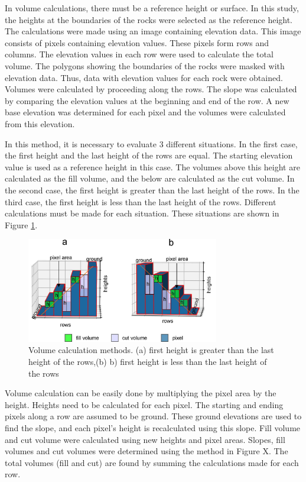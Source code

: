 \documentclass[a4paper,fleqn]{cas-sc}
\begin{document}
In volume calculations, there must be a reference height or surface. In this study, the heights at the boundaries of the rocks were selected as the reference height. The calculations were made using an image containing elevation data. This image consists of pixels containing elevation values. These pixels form rows and columns. The elevation values in each row were used to calculate the total volume. The polygons showing the boundaries of the rocks were masked with elevation data. Thus, data with elevation values for each rock were obtained. Volumes were calculated by proceeding along the rows. The slope was calculated by comparing the elevation values at the beginning and end of the row. A new base elevation was determined for each pixel and the volumes were calculated from this elevation.

In this method, it is necessary to evaluate 3 different situations. In the first case, the first height and the last height of the rows are equal. The starting elevation value is used as a reference height in this case. The volumes above this height are calculated as the fill volume, and the below are calculated as the cut volume. In the second case, the first height is greater than the last height of the rows. In the third case, the first height is less than the last height of the rows. Different calculations must be made for each situation. These situations are shown in Figure \ref{fig:Figure8}.
\begin{figure}
	\centering
	\includegraphics[width=0.75\textwidth]{figures/fig8.jpg}
	\caption{Volume calculation methods. (a) first height is greater than the last height of the rows,(b) b) first height is less than the last height of the rows}
	\label{fig:Figure8}
\end{figure}

Volume calculation can be easily done by multiplying the pixel area by the height. Heights need to be calculated for each pixel. The starting and ending pixels along a row are assumed to be ground. These ground elevations are used to find the slope, and each pixel's height is recalculated using this slope. Fill volume and cut volume were calculated using new heights and pixel areas. Slopes, fill volumes and cut volumes were determined using the method in Figure X. The total volumes (fill and cut) are found by summing the calculations made for each row.
\end{document}
